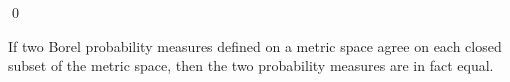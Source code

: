 \qed


\begin{corollary}
\mbox{}\vskip 0.1cm
\noindent
If two Borel probability measures defined on a metric space agree on each closed subset of the metric space,
then the two probability measures are in fact equal.
\end{corollary}


\renewcommand{\theenumi}{\roman{enumi}}
\renewcommand{\labelenumi}{\textnormal{(\theenumi)}$\;\;$}

